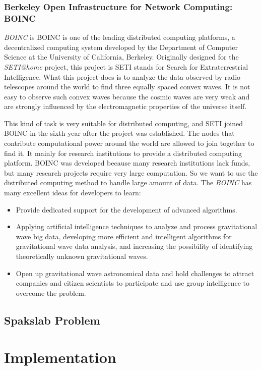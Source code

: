 \documentclass[11pt]{book}
\begin{document}
\subsection{Berkeley Open Infrastructure for Network Computing: BOINC}
\textit{BOINC} is BOINC is one of the leading distributed computing platforms, 
a decentralized computing system developed by the Department of Computer Science at the University of California, Berkeley. 
Originally designed for the \textit{SETI@home} project, this project is 
SETI stands for Search for Extraterrestrial Intelligence. What this project does is to analyze the data observed by radio telescopes around the world to find three equally spaced convex waves. It is not easy to observe such convex waves because the cosmic waves are very weak and are strongly influenced by the electromagnetic properties of the universe itself.

This kind of task is very suitable for distributed computing, and SETI joined BOINC in the sixth year after the project was established. The nodes that contribute computational power around the world are allowed to join together to find it.
It mainly for research institutions to provide a distributed computing platform. BOINC was developed because many research institutions lack funds, but many research projects require very large computation. So we want to use the distributed computing method to handle large amount of data.
The \textit{BOINC} has many excellent ideas for developers to learn:
\begin{itemize}
	\item Provide dedicated support for the development of advanced algorithms.
 \item Applying artificial intelligence techniques to analyze and process gravitational wave big data, developing more efficient and intelligent algorithms for gravitational wave data analysis, and increasing the possibility of identifying theoretically unknown gravitational waves.
 \item Open up gravitational wave astronomical data and hold challenges to attract companies and citizen scientists to participate and use group intelligence to overcome the problem.
\end{itemize}
\section{Spakslab Problem}

\chapter{Implementation}
\end{document}
